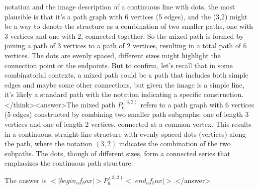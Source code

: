 notation and the image description of a continuous line with dots, the most plausible is that it's a path graph with 6 vertices (5 edges), and the (3,2) might be a way to denote the structure as a combination of two smaller paths, one with 3 vertices and one with 2, connected together. So the mixed path is formed by joining a path of 3 vertices to a path of 2 vertices, resulting in a total path of 6 vertices. The dots are evenly spaced, different sizes might highlight the connection point or the endpoints. But to confirm, let's recall that in some combinatorial contexts, a mixed path could be a path that includes both simple edges and maybe some other connections, but given the image is a simple line, it's likely a standard path with the notation indicating a specific construction.</think><answer>The mixed path \( P_6^{(3,2)} \) refers to a path graph with 6 vertices (5 edges) constructed by combining two smaller path subgraphs: one of length 3 vertices and one of length 2 vertices, connected at a common vertex. This results in a continuous, straight-line structure with evenly spaced dots (vertices) along the path, where the notation \( (3,2) \) indicates the combination of the two subpaths. The dots, though of different sizes, form a connected series that emphasizes the continuous path structure.  

The answer is \(<|begin_of_box|>P_6^{(3,2)}<|end_of_box|>\).</answer>